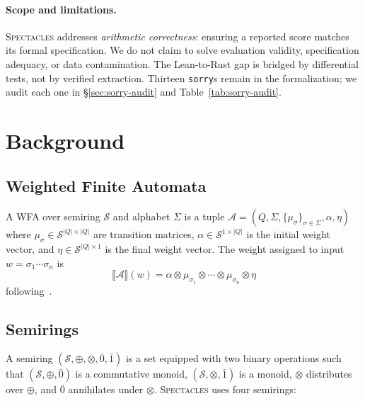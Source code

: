 \documentclass[11pt]{article}
\newcommand{\spectacles}{\textsc{Spectacles}}
\newcommand{\semiring}[1]{\mathcal{#1}}
\newcommand{\wfa}{\mathcal{A}}
\newcommand{\sorry}{\texttt{sorry}}
\begin{document}
\paragraph{Scope and limitations.}
\spectacles{} addresses \emph{arithmetic correctness}: ensuring
a reported score matches its formal specification.
We do not claim to solve evaluation validity, specification adequacy,
or data contamination.
The Lean-to-Rust gap is bridged by differential tests, not by
verified extraction.
Thirteen \sorry{}s remain in the formalization; we audit each one
in \S\ref{sec:sorry-audit} and Table~\ref{tab:sorry-audit}.


\section{Background}\label{sec:background}

\subsection{Weighted Finite Automata}

A WFA over semiring $\semiring{S}$ and alphabet $\Sigma$ is a tuple
$\wfa = (Q,\Sigma,\allowbreak \{\mu_\sigma\}_{\sigma\in\Sigma},
\alpha,\eta)$ where
$\mu_\sigma \in \semiring{S}^{|Q|\times|Q|}$ are transition
matrices, $\alpha \in \semiring{S}^{1\times|Q|}$ is the initial
weight vector, and $\eta \in \semiring{S}^{|Q|\times 1}$ is the
final weight vector.  The weight assigned to input
$w = \sigma_1\cdots\sigma_n$ is
\[
\llbracket\wfa\rrbracket(w) = \alpha \otimes \mu_{\sigma_1} \otimes
\cdots \otimes \mu_{\sigma_n} \otimes \eta
\]
following~\cite{schutzenberger1961,droste2009handbook}.

\subsection{Semirings}\label{sec:semirings}

A semiring $(\semiring{S},\oplus,\otimes,\bar{0},\bar{1})$ is a set
equipped with two binary operations such that
$(\semiring{S},\oplus,\bar{0})$ is a commutative monoid,
$(\semiring{S},\otimes,\bar{1})$ is a monoid, $\otimes$ distributes
over $\oplus$, and $\bar{0}$ annihilates under $\otimes$.
\spectacles{} uses four semirings:
\end{document}
